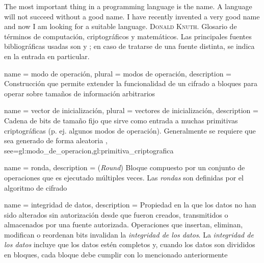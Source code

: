 %
%
%


\makeglossaries

\setglossarypreamble
{%
  {
    \epigrafe
    {%
      The most important thing in a programming language is the name. A
      language will not succeed without a good name. I have recently invented a
      very good name and now I am looking for a suitable language.%
    }
    {%
      \textsc{Donald Knuth}.%
    }
  }%
  \noindent
  Glosario de términos de computación, criptográficos y matemáticos. Las
  principales fuentes bibliográficas usadas son \cite{menezes} y
  \cite{stallings}; en caso de tratarse de una fuente distinta, se indica en la
  entrada en particular.
}

{
  name = modo de operación,
  plural = modos de operación,
  description = {
    Construcción que permite extender la funcionalidad de un cifrado a bloques
    para operar sobre tamaños de información arbitrarios%
  }
}

{
  name = vector de inicialización,
  plural = vectores de inicialización,
  description = {
    Cadena de bits de tamaño fijo que sirve como entrada a muchas primitivas
    criptográficas (p. ej. algunos modos de operación). Generalmente
    se requiere que sea generado de forma aleatoria%
  },
  see={gl:modo_de_operacion,gl:primitiva_criptografica}
}

{
  name = ronda,
  description = {
    (\textit{Round}) Bloque compuesto por un conjunto de operaciones que es
    ejecutado múltiples veces. Las \textit{rondas} son definidas por el
    algoritmo de cifrado%
  }
}

{
  name = integridad de datos,
  description = {
    Propiedad en la que los datos no han sido alterados sin autorización desde
    que fueron creados, transmitidos o almacenados por una fuente autorizada.
    Operaciones que insertan, eliminan, modifican o reordenan bits invalidan
    la \textit{integridad de los datos}. La \textit{integridad de los datos}
    incluye que los datos estén completos y, cuando los datos son divididos en
    bloques, cada bloque debe cumplir con lo mencionado anteriormente%
  }
}

